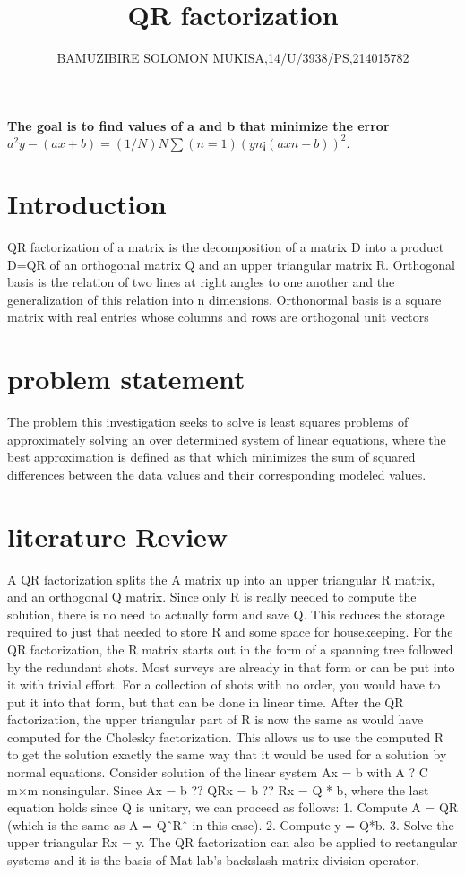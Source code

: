 \documentclass[12pt, letterpaper]{article}
\begin{document}
\paragraph{The goal is to find values of a and b that minimize the error
	$a^2y-(ax+b) =(1/N)N∑(n=1)(yn ¡ (axn + b))^2.$
}
\title{\bfseries QR factorization}
\author{BAMUZIBIRE SOLOMON MUKISA,14/U/3938/PS,214015782}
\section{Introduction}
QR factorization of a matrix is the decomposition of a matrix D into a product D=QR of an orthogonal matrix Q and an upper triangular matrix R.
Orthogonal basis is the relation of two lines at right angles to one another and the generalization of this relation into n dimensions.
Orthonormal basis is a square matrix with real entries whose columns and rows are orthogonal unit vectors
\section{problem statement}
The problem this investigation seeks to solve is least squares problems of approximately solving an over determined system of linear equations, where the best approximation is defined as that which minimizes the sum of squared differences between the data values and their corresponding modeled values.

\section{literature Review}
A QR factorization splits the A matrix up into an upper triangular R matrix, and an orthogonal Q matrix. Since only R is really needed to compute the solution, there is no need to actually form and save Q. This reduces the storage required to just that needed to store R and some space for housekeeping.
For the QR factorization, the R matrix starts out in the form of a spanning tree followed by the redundant shots. Most surveys are already in that form or can be put into it with trivial effort. For a collection of shots with no order, you would have to put it into that form, but that can be done in linear time.
After the QR factorization, the upper triangular part of R is now the same as would have computed for the Cholesky factorization. This allows us to use the computed R to get the solution exactly the same way that it would be used for a solution by normal equations.
Consider solution of the linear system Ax = b with A ? C m×m nonsingular.
Since Ax = b ?? QRx = b ?? Rx = Q * b, where the last equation holds since Q is unitary, we can proceed as follows:
1. Compute A = QR (which is the same as A = QˆRˆ in this case).
2. Compute y = Q*b.
3. Solve the upper triangular Rx = y.
The QR factorization can also be applied to rectangular systems and it is the basis of Mat lab’s backslash matrix division operator.
\end{document}

